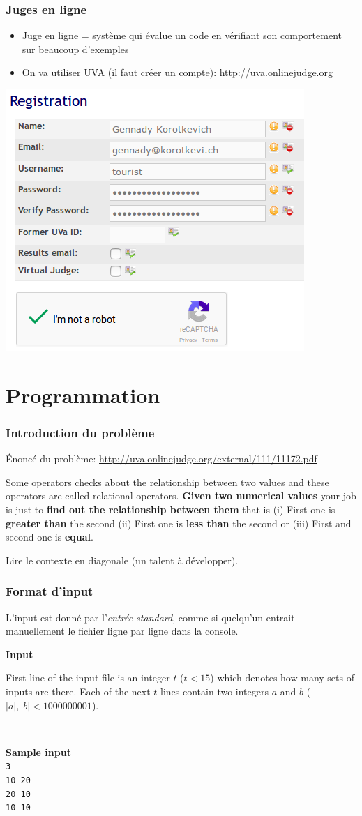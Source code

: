 \documentclass[12pt]{beamer}
\newcommand{\urlb}[1]{{\color{linkblue}\url{#1}}}
\begin{document}
\begin{frame}
\frametitle{Juges en ligne}
\begin{itemize}
\item Juge en ligne = système qui évalue un code en vérifiant son comportement sur beaucoup d'exemples
\item On va utiliser UVA (il faut créer un compte): \urlb{http://uva.onlinejudge.org}
\end{itemize}
\begin{center}
\includegraphics[height=0.45\linewidth]{img/uva-signup}
\end{center}
\end{frame}


\section{Programmation}

\begin{frame}
\frametitle{Introduction du problème}
Énoncé du problème: \urlb{http://uva.onlinejudge.org/external/111/11172.pdf}

\begin{framed}
Some operators checks about the relationship between two values and these operators are called relational operators. \textbf{Given two numerical values} your job is just to \textbf{find out the relationship between them} that is (i) First one is \textbf{greater than} the second (ii) First one is \textbf{less than} the second or (iii) First and second one is \textbf{equal}.
\end{framed}
Lire le contexte en diagonale (un talent à développer).
\end{frame}

\begin{frame}[fragile]
\frametitle{Format d'input}
L'input est donné par l'\emph{entrée standard}, comme si quelqu'un entrait manuellement le fichier ligne par ligne dans la console.

\begin{framed}
\textbf{Input}

First line of the input file is an integer $t$ ($t < 15$) which denotes how many sets of inputs are there.
Each of the next $t$ lines contain two integers $a$ and $b$ ($|a|, |b| < 1000000001$).

~

\textbf{Sample input}\\
\texttt{3\\
10 20\\
20 10\\
10 10
}
\end{framed}
\end{frame}
\end{document}
